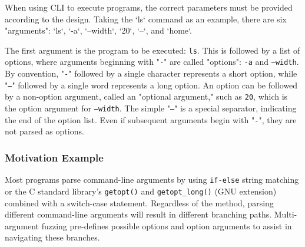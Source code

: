 When using CLI to execute programs, the correct parameters must be provided according to the design. Taking the `ls` command as an example, there are six "arguments": `ls`, `-a`, `--width`, `20`, `--`, and `home`.

The first argument is the program to be executed: \texttt{ls}. This is followed by a list of options, where arguments beginning with "\texttt{-}" are called "options": \texttt{-a} and \texttt{--width}. By convention, "\texttt{-}" followed by a single character represents a short option, while "\texttt{--}" followed by a single word represents a long option. An option can be followed by a non-option argument, called an "optional argument," such as \texttt{20}, which is the option argument for \texttt{--width}. The simple "\texttt{--}" is a special separator, indicating the end of the option list. Even if subsequent arguments begin with "\texttt{-}", they are not parsed as options.

\subsubsection{Motivation Example} %

Most programs parse command-line arguments by using \texttt{if-else} string matching  or the C standard library's \texttt{getopt()} and \texttt{getopt\_long()} (GNU extension) combined with a switch-case statement. Regardless of the method, parsing different command-line arguments will result in different branching paths. Multi-argument fuzzing pre-defines possible options and option arguments to assist in navigating these branches.

